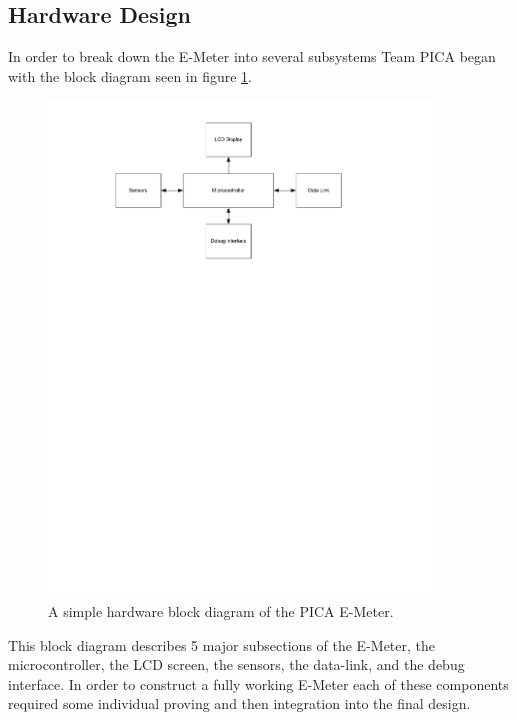 \subsection{Hardware Design}
In order to break down the E-Meter into several subsystems Team PICA began with the block diagram seen in figure \ref{fig:simple_e_meter_diagram}.
\begin{figure}[htbp]
\begin{center}
\includegraphics[width=4in]{includes/Simplified_MSP430}
\caption{A simple hardware block diagram of the PICA E-Meter.}
\label{fig:simple_e_meter_diagram}
\end{center}
\end{figure}
This block diagram describes 5 major subsections of the E-Meter, the microcontroller, the \ac{LCD} screen, the sensors, the data-link, and the debug interface. In order to construct a fully working E-Meter each of these components required some individual proving and then integration into the final design.

